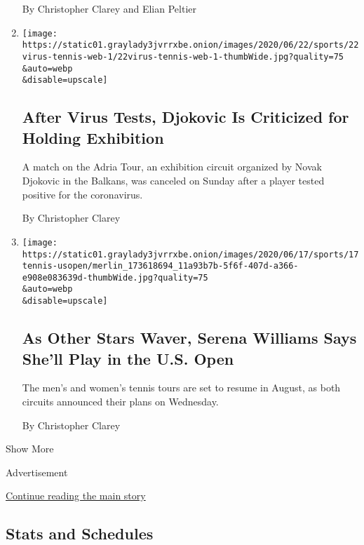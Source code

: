 \begin{enumerate}
  By Christopher Clarey and Elian Peltier
\item
  \href{/2020/06/22/sports/tennis/djokovic-exhibition-positive-tests-coronavirus.html}{}

  \texttt{[image: https://static01.graylady3jvrrxbe.onion/images/2020/06/22/sports/22virus-tennis-web-1/22virus-tennis-web-1-thumbWide.jpg?quality=75\\\&auto=webp\\\&disable=upscale]}

  \hypertarget{after-virus-tests-djokovic-is-criticized-for-holding-exhibition}{%
  \subsection{After Virus Tests, Djokovic Is Criticized for Holding
  Exhibition}\label{after-virus-tests-djokovic-is-criticized-for-holding-exhibition}}

  A match on the Adria Tour, an exhibition circuit organized by Novak
  Djokovic in the Balkans, was canceled on Sunday after a player tested
  positive for the coronavirus.

  By Christopher Clarey
\item
  \href{/2020/06/17/sports/tennis/serena-williams-us-open.html}{}

  \texttt{[image: https://static01.graylady3jvrrxbe.onion/images/2020/06/17/sports/17tennis-usopen/merlin\_173618694\_11a93b7b-5f6f-407d-a366-e908e083639d-thumbWide.jpg?quality=75\\\&auto=webp\\\&disable=upscale]}

  \hypertarget{as-other-stars-waver-serena-williams-says-shell-play-in-the-us-open}{%
  \subsection{As Other Stars Waver, Serena Williams Says She'll Play in
  the U.S.
  Open}\label{as-other-stars-waver-serena-williams-says-shell-play-in-the-us-open}}

  The men's and women's tennis tours are set to resume in August, as
  both circuits announced their plans on Wednesday.

  By Christopher Clarey
\end{enumerate}

Show More

Advertisement

\protect\hyperlink{after-mid1}{Continue reading the main story}

\hypertarget{stats-and-schedules}{%
\subsection{Stats and Schedules}\label{stats-and-schedules}}

